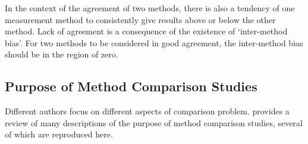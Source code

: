 \documentclass[12pt, a4paper]{report}
\theoremstyle{plain}
\theoremstyle{definition}
\theoremstyle{remark}
\begin{document}

In the context of the agreement of two methods, there is also a
tendency of one measurement method to consistently give results
above or below the other method. Lack of agreement is a
consequence of the existence of `inter-method bias'. For two
methods to be considered in good agreement, the inter-method bias
should be in the region of zero.

	\subsection{Purpose of Method Comparison Studies}
	Different authors focus on different aspects of comparison problem. \citet{BXC2010} provides a review of many descriptions of the purpose of method comparison studies, several of which are reproduced here.
	
\end{document}
